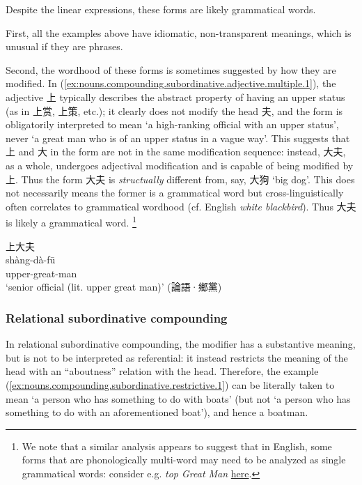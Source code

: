 \documentclass[UTF8, a4paper, oneside, scheme=plain, 12pt]{ctexrep}
\newcommand{\form}[1]{\emph{#1}}
\newcommand{\translate}[1]{`#1'}
\begin{document}
Despite the linear expressions, these forms are likely grammatical words.

First, all the examples above have idiomatic, non-transparent meanings, 
which is unusual if they are phrases.

Second, the wordhood of these forms is sometimes suggested by how they are modified.
In (\ref{ex:nouns.compounding.subordinative.adjective.multiple.1}),
the adjective 上 typically describes the abstract property of having an upper status
(as in 上赏, 上策, etc.);
it clearly does not modify the head 夫, and the form is obligatorily interpreted to mean
\translate{a high-ranking official with an upper status},
never \translate{a great man who is of an upper status in a vague way}.
This suggests that 上 and 大 in the form are not in the same modification sequence:
instead, 大夫, as a whole, undergoes adjectival modification and is capable of being modified by 上.
Thus the form 大夫 is \emph{structually} different from, say, 大狗 \translate{big dog}.
This does not necessarily means the former is a grammatical word
but cross-linguistically often correlates to grammatical wordhood (cf. English \form{white blackbird}).
Thus 大夫 is likely a grammatical word.%
\footnote{
    We note that a similar analysis appears to suggest that in English,
    some forms that are phonologically multi-word may need to be analyzed as single grammatical words:
    consider e.g. \form{top Great Man} \href{https://www.jstor.org/stable/29757772}{here}.
}

\begin{exe}
    \ex\label{ex:nouns.compounding.subordinative.adjective.multiple.1}
    \glll 上大夫 \\
    shàng-dà-fū \\
    upper-great-man \\
    \glt\translate{senior official (lit. upper great man)} \hfill (論語·鄉黨)
\end{exe}


\subsubsection{Relational subordinative compounding}


In relational subordinative compounding, the modifier has a substantive meaning,
but is not to be interpreted as referential:
it instead restricts the meaning of the head with an ``aboutness'' relation with the head.
Therefore, the example (\ref{ex:nouns.compounding.subordinative.restrictive.1}) can be literally taken to mean 
\translate{a person who has something to do with boats} (but not \translate{a person who has something to do with an aforementioned boat}),
and hence a boatman.
\end{document}
